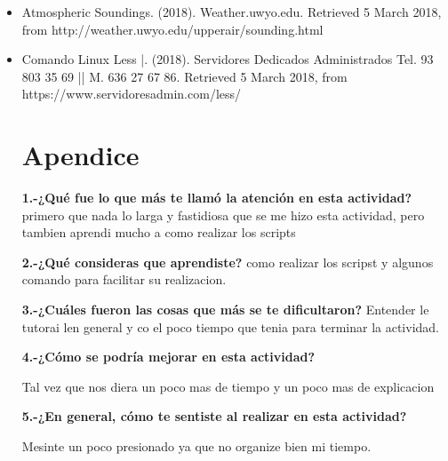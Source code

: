 \documentclass{article}
\begin{document}
\begin{itemize}
\begin{itemize}
\item Atmospheric Soundings. (2018). Weather.uwyo.edu. Retrieved 5 March 2018, from http://weather.uwyo.edu/upperair/sounding.html

\item Comando Linux Less |. (2018). Servidores Dedicados Administrados Tel. 93 803 35 69 || M. 636 27 67 86. Retrieved 5 March 2018, from https://www.servidoresadmin.com/less/




\section{Apendice}


\textbf{1.-¿Qué fue lo que más te llamó la atención en esta actividad?}
 primero que nada lo larga y fastidiosa que se me hizo esta actividad, pero tambien aprendi mucho a como realizar los scripts
 
\textbf{ 2.-¿Qué consideras que aprendiste?}
como realizar los scripst y algunos comando para facilitar su realizacion.

\textbf{3.-¿Cuáles fueron las cosas que más se te dificultaron?}
Entender le tutorai len general y co el poco tiempo que tenia para terminar la actividad.


\textbf{4.-¿Cómo se podría mejorar en esta actividad?}

Tal vez que nos diera un poco mas de tiempo y un poco mas de explicacion


\textbf{ 5.-¿En general, cómo te sentiste al realizar en esta actividad? } 

Mesinte un poco presionado ya que no organize bien mi tiempo.  


\end{itemize}







\end{itemize}
\end{document}
